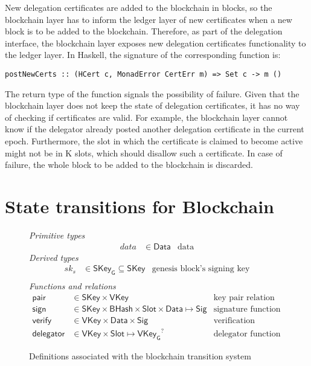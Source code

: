 \documentclass[11pt,a4paper]{article}
\newcommand{\fun}[1]{\mathsf{#1}}
\newcommand{\type}[1]{\mathsf{#1}}
\newcommand{\BHash}{\type{BHash}}  %
\newcommand{\Slot}{\type{Slot}}
\newcommand{\SKey}{\type{SKey}}
\newcommand{\SKeyGen}{\type{SKey_G}}
\newcommand{\VKey}{\type{VKey}}
\newcommand{\VKeyGen}{\type{VKey_G}}
\newcommand{\Sig}{\type{Sig}}
\newcommand{\Data}{\type{Data}}
\newcommand{\signname}{sign}
\newcommand{\verifyname}{verify}
\newcommand{\keypairname}{pair}
\newcommand{\delegatorname}{delegator} %
\newcommand{\partialf}{\mapsto}
\begin{document}
New delegation certificates are added to the blockchain in blocks, so the
blockchain layer has to inform the ledger layer of new certificates when a new
block is to be added to the blockchain.
%
Therefore, as part of the delegation interface, the blockchain layer exposes
new delegation certificates functionality to the ledger layer.
%
In Haskell, the signature of the corresponding function is:
%
\begin{lstlisting}
postNewCerts :: (HCert c, MonadError CertErr m) => Set c -> m ()
\end{lstlisting}
%
The return type of the function signals the possibility of failure.
%
Given that the blockchain layer does not keep the state of delegation
certificates, it has no way of checking if certificates are valid.
%
For example, the blockchain layer cannot know if the delegator already posted
another delegation certificate in the current epoch.
%
Furthermore, the slot in which the certificate is claimed to become active
might not be in K slots, which should disallow such a certificate.
%
In case of failure, the whole block to be added to the blockchain is
discarded.


\section{State transitions for Blockchain}
\label{sec:state-trans-chain}

\begin{figure}[h]
  \emph{Primitive types}
  \begin{align*}
  data & \in \Data    & \text{data}
  \end{align*}
  \emph{Derived types}
  \begin{align*}
    sk_s & \in \SKeyGen \subseteq \SKey & \text{genesis block's signing key}\\
  \end{align*}
  \emph{Functions and relations}
  \begin{align*}
    \fun{\keypairname} & \in \SKey \times \VKey & \text{key pair relation}\\
    \fun{\signname} & \in \SKey \times \BHash \times \Slot \times \Data \partialf \Sig
      & \text{signature function}\\
    \fun{\verifyname} & \in \VKey \times \Data \times \Sig
      & \text{verification relation}\\
    \fun{\delegatorname} & \in \VKey \times \Slot \partialf \VKeyGen^?
      & \text{delegator function}
  \end{align*}
  \caption{Definitions associated with the blockchain transition system}
  \label{fig:state-trans-abstract}
\end{figure}
\end{document}
